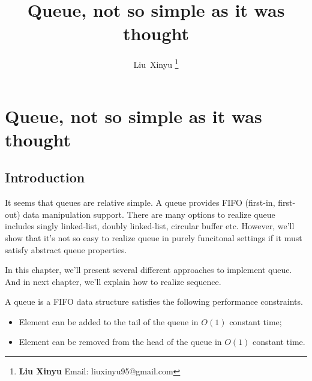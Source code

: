 \documentclass{article}
\begin{document}
\fi


\title{Queue, not so simple as it was thought}

\author{Liu~Xinyu
\thanks{{\bfseries Liu Xinyu } \newline
  Email: liuxinyu95@gmail.com \newline}
  }


\maketitle

\ifx\wholebook\relax
\chapter{Queue, not so simple as it was thought}
\fi

\section{Introduction}
\label{introduction}
It seems that queues are relative simple. A queue provides FIFO (first-in,
first-out) data manipulation support. There are many options to 
realize queue includes singly linked-list, doubly linked-list,
circular buffer etc. However, we'll show that it's not so easy to 
realize queue in purely funcitonal settings if it must satisfy
abstract queue properties.

In this chapter, we'll present several different approaches to 
implement queue. And in next chapter, we'll explain how to realize
sequence.

A queue is a FIFO data structure satisfies the following performance
constraints.

\begin{itemize}
\item Element can be added to the tail of the queue in $O(1)$ constant time;
\item Element can be removed from the head of the queue in $O(1)$ constant time.
\end{itemize}
\end{document}
